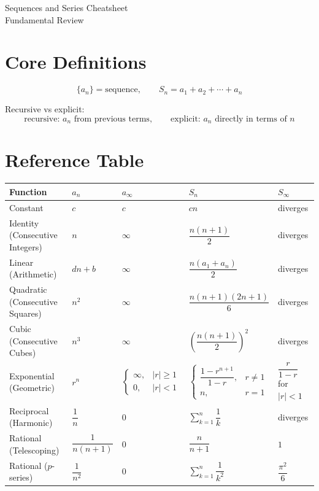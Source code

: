 \documentclass[11pt]{article}
\begin{document}
\begin{center}
{\LARGE Sequences and Series Cheatsheet}\\[0.4em]
{\large Fundamental Review}
\end{center}

\section*{Core Definitions}
\[
\{a_n\}=\text{sequence},\qquad
S_n=a_1+a_2+\cdots+a_n
\]

Recursive vs explicit:
\[
\text{recursive: } a_n \text{ from previous terms},\qquad
\text{explicit: } a_n \text{ directly in terms of } n
\]

\section*{Reference Table}
\renewcommand{\arraystretch}{1.3}
\begin{center}
\scriptsize
\setlength{\tabcolsep}{4pt}
\begin{tabular}{>{\raggedright\arraybackslash}p{2.25in}>{\centering\arraybackslash}p{0.85in}>{\centering\arraybackslash}p{0.95in}>{\centering\arraybackslash}p{1.1in}>{\centering\arraybackslash}p{0.95in}}
\toprule
\textbf{Function} & \textbf{$a_n$} & \textbf{$a_\infty$} & \textbf{$S_n$} & \textbf{$S_\infty$} \\
\midrule
Constant & $c$ & $c$ & $cn$ & diverges \\
Identity (Consecutive Integers) & $n$ & $\infty$ & $\dfrac{n(n+1)}{2}$ & diverges \\
Linear (Arithmetic) & $dn+b$ & $\infty$ & $\dfrac{n(a_1+a_n)}{2}$ & diverges \\
Quadratic (Consecutive Squares) & $n^2$ & $\infty$ & $\dfrac{n(n+1)(2n+1)}{6}$ & diverges \\
Cubic (Consecutive Cubes) & $n^3$ & $\infty$ & $\left(\dfrac{n(n+1)}{2}\right)^2$ & diverges \\
Exponential (Geometric) & $r^n$ &
$\begin{cases}\infty,& |r|\ge 1\\0,& |r|<1\end{cases}$ &
$\begin{cases}\dfrac{1-r^{n+1}}{1-r},& r\ne 1\\ n,& r=1\end{cases}$ &
$\dfrac{r}{1-r}$ for $|r|<1$ \\
Reciprocal (Harmonic) & $\dfrac{1}{n}$ & $0$ & $\displaystyle\sum_{k=1}^{n}\dfrac{1}{k}$ & diverges \\
Rational (Telescoping) & $\dfrac{1}{n(n+1)}$ & $0$ & $\dfrac{n}{n+1}$ & $1$ \\
Rational ($p$-series) & $\dfrac{1}{n^2}$ & $0$ & $\displaystyle\sum_{k=1}^{n}\dfrac{1}{k^2}$ & $\dfrac{\pi^2}{6}$ \\
\bottomrule
\end{tabular}
\end{center}
\end{document}
